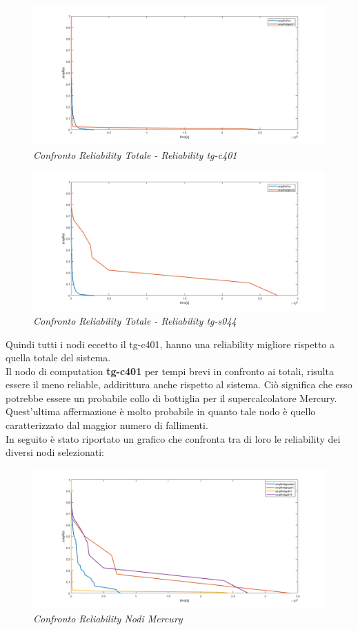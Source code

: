 \begin{figure}[H]
	\centering
	\includegraphics[width=\textwidth]{img/hw6/Rel_Tot_Tgc.png}
	\caption{\textit{Confronto Reliability Totale - Reliability tg-c401}}
\end{figure}
\begin{figure}[H]
	\centering
	\includegraphics[width=\textwidth]{img/hw6/Rel_Tot_Tgs.png}
	\caption{\textit{Confronto Reliability Totale - Reliability tg-s044}}
\end{figure}
Quindi tutti i nodi eccetto il tg-c401, hanno una reliability migliore rispetto a quella totale del sistema. 
\\Il nodo di computation \textbf{tg-c401} per tempi brevi in confronto ai totali, risulta essere il meno reliable, addirittura anche rispetto al sistema. Ciò significa che esso potrebbe essere un probabile collo di bottiglia per il supercalcolatore Mercury. Quest'ultima affermazione è molto probabile in quanto tale nodo è quello caratterizzato dal maggior numero di fallimenti.
\\In seguito è stato riportato un grafico che confronta tra di loro le reliability dei diversi nodi selezionati:
\begin{figure}[H]
	\centering
	\includegraphics[width=\textwidth]{img/hw6/confrontoMercury.png}
	\caption{\textit{Confronto Reliability Nodi Mercury}}
\end{figure}
